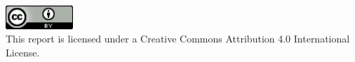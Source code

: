 \newpage
\thispagestyle{empty}
\null
\vspace{\fill}
\begin{center}
    \includegraphics[width=1in]{./license.png} \\
    This report is licensed under a Creative Commons Attribution 4.0
    International License.
\end{center}
